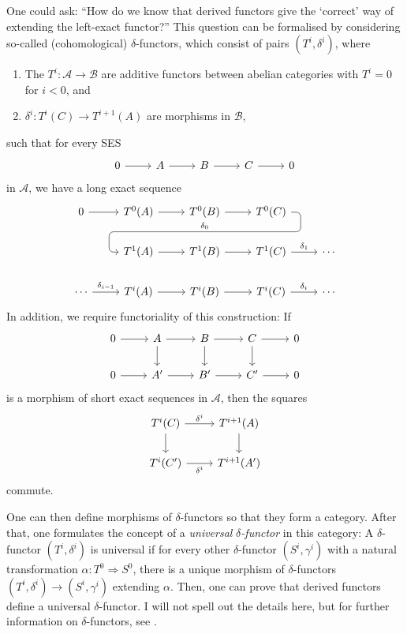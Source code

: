 \begin{bcat}
  One could ask: ``How do we know that derived functors give the `correct'
  way of extending the left-exact functor?'' This question can be
  formalised by considering so-called (cohomological) $\delta$-functors,
  which consist of pairs $(T^{i},\delta^{i})$, where
  \begin{enumerate}
    \item The $T^{i}:\mathcal{A}\to\mathcal{B}$ are additive functors between
          abelian categories with $T^{i}=0$ for $i<0$, and
    \item $\delta^{i}:T^{i}(C)\to T^{i+1}(A)$ are morphisms in $\mathcal{B}$,
  \end{enumerate}
  such that for every SES
  \[\begin{tikzcd}
      0\rar & A\rar & B\rar & C\rar & 0
    \end{tikzcd}\]
  in $\mathcal{A}$, we have a long exact sequence
  \[\begin{tikzcd}
      0\rar & T^{0}(A)\rar & T^{0}(B)\rar\dar[phantom, ""{coordinate, name=Z}]
      & T^{0}(C)\arrow[rounded corners, to path={[pos=0] --
      ([xshift=2ex]\tikztostart.east) |- (Z) -|
      ([xshift=-2ex]\tikztotarget.west)\tikztonodes -- (\tikztotarget)},
    "\delta_{0}"']{dll} & \\
    & T^{1}(A)\rar & T^{1}(B)\rar & T^{1}(C)\rar{\delta_{1}} & \cdots \\
    \cdots \rar{\delta_{i-1}}& T^{i}(A)\rar & T^{i}(B)\rar
    & T^{i}(C)\rar{\delta_{i}} & \cdots
    \end{tikzcd}\]
  In addition, we require functoriality of this construction: If
  \[\begin{tikzcd}
      0\rar & A\rar\dar & B\rar\dar & C\rar\dar & 0 \\
      0\rar & A^{\prime}\rar & B^{\prime}\rar & C^{\prime}\rar & 0
    \end{tikzcd}\]
  is a morphism of short exact sequences in $\mathcal{A}$, then the
  squares
  \[\begin{tikzcd}
      T^{i}(C)\rar{\delta^{i}}\dar & T^{i+1}(A)\dar \\
      T^{i}(C^{\prime})\arrow["\delta^{i}"']{r} & T^{i+1}(A^{\prime})
    \end{tikzcd}\]
  commute.

  One can then define morphisms of $\delta$-functors so that they form
  a category. After that, one formulates the concept of a \emph{universal}
  $\delta$\emph{-functor} in this category: A $\delta$-functor
  $(T^{i},\delta^{i})$ is universal if for every other $\delta$-functor
  $(S^{i},\gamma^{i})$ with a natural transformation
  $\alpha: T^{0}\Rightarrow S^{0}$, there is a unique morphism of
  $\delta$-functors $(T^{i},\delta^{i})\to (S^{i},\gamma^{i})$ extending
  $\alpha$. Then, one can prove that derived functors define a universal
  $\delta$-functor. I will not spell out the details here, but for further
  information on $\delta$-functors, see \cite{vakil}.
\end{bcat}
